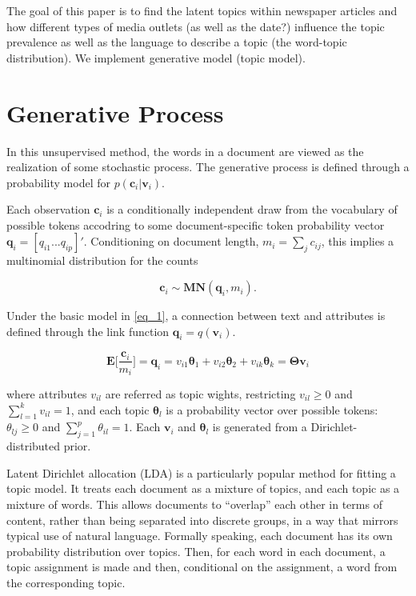 \documentclass[12pt,a4paper,notitlepage]{article}
\begin{document}
The goal of this paper is to find the latent topics within newspaper articles and how different types of media outlets (as well as the date?) influence the topic prevalence as well as the language to describe a topic (the word-topic distribution). We implement generative model (topic model). 



\section{Generative Process}

In this unsupervised method, the words in a document are viewed as the realization of some stochastic process. The generative process is defined through a probability model for $p(\boldsymbol{c}_i|\boldsymbol{v}_i)$.

Each observation $\boldsymbol{c}_i$ is a conditionally independent draw from the vocabulary of possible tokens accodring to some document-specific token probability vector $\boldsymbol{q}_i=[q_{i1}...q_{ip}]'$. Conditioning on document length, $m_i=\sum_jc_{ij}$, this implies a multinomial distribution for the counts

\begin{equation}\label{eq_1}
	\boldsymbol{c}_i \sim \boldsymbol{MN}(\boldsymbol{q}_i,m_i). 
\end{equation}

Under the basic model in \ref{eq_1}, a connection between text and attributes is defined through the link function $\boldsymbol{q}_i=q(\boldsymbol{v}_i)$. 

\begin{equation}\label{eq_2}
	\boldsymbol{E} \bigg[\frac{\boldsymbol{c}_i}{m_i}\bigg]=\boldsymbol{q}_i =v_{i1}\boldsymbol{\theta}_1+v_{i2}\boldsymbol{\theta}_2+v_{ik}\boldsymbol{\theta}_k=\boldsymbol{\Theta v}_i
\end{equation}

where attributes $v_{il}$ are referred as topic wights, restricting $v_{il}\geq 0$ and $\sum^k_{l=1}v_{il}=1$, and each topic $\boldsymbol{\theta}_l$ is a probability vector over possible tokens: $\theta_{lj}\geq 0$ and $\sum^p_{j=1}\theta_{il}=1$. Each $\boldsymbol{v}_i$ and $\boldsymbol{\theta}_l$ is generated from a Dirichlet-distributed prior.

Latent Dirichlet allocation (LDA) is a particularly popular method for fitting a topic model. It treats each document as a mixture of topics, and each topic as a mixture of words. This allows documents to “overlap” each other in terms of content, rather than being separated into discrete groups, in a way that mirrors typical use of natural language. Formally speaking, each document has its own probability distribution over topics. Then, for each word in each document, a topic assignment is made and then, conditional on the assignment, a word from the corresponding topic. 
\end{document}
